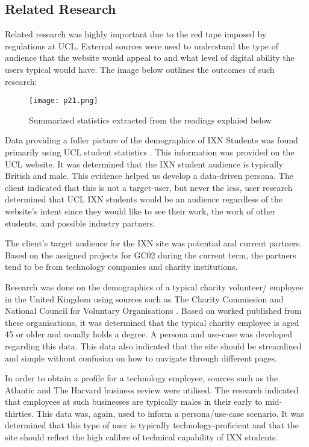 \documentclass[fontsize=11pt]{extarticle}
\numberwithin{figure}{section} %
\begin{document}
\hypertarget{related-research}{%
\subsection{Related Research}\label{related-research}}

Related research was highly important due to the red tape imposed by
regulations at UCL. External sources were used to understand the type of
audience that the website would appeal to and what level of digital
ability the users typical would have. The image below outlines the
outcomes of such research:

\begin{figure}[H]
      \centering
      \texttt{[image: p21.png]}
      \caption{Summarized statistics extracted from the readings explaied below}
 \end{figure}

Data providing a fuller picture of the demographics of IXN Students was
found primarily using UCL student statistics \cite{ps1}. This
information was provided on the UCL website. It was determined that the
IXN student audience is typically British and male. This evidence helped
us develop a data-driven persona. The client indicated that this is not
a target-user, but never the less, user research determined that UCL IXN
students would be an audience regardless of the website's intent since
they would like to see their work, the work of other students, and
possible industry partners.

The client's target audience for the IXN site was potential and current
partners. Based on the assigned projects for GC02 during the current
term, the partners tend to be from technology companies and charity
institutions.

Research was done on the demographics of a typical charity volunteer/
employee in the United Kingdom using sources such as The Charity
Commission \cite{ps2} and National Council for Voluntary Organisations
\cite{ps3}. Based on worked published from these organisations, it was
determined that the typical charity employee is aged 45 or older and
usually holds a degree. A persona and use-case was developed regarding
this data. This data also indicated that the site should be streamlined
and simple without confusion on how to navigate through different pages.

In order to obtain a profile for a technology employee, sources such as
the Atlantic \cite{ps4} and The Harvard business review \cite{ps5} were
utilised. The research indicated that employees at such businesses are
typically males in their early to mid-thirties. This data was, again,
used to inform a persona/use-case scenario. It was determined that this
type of user is typically technology-proficient and that the site should
reflect the high calibre of technical capability of IXN students.
\end{document}
